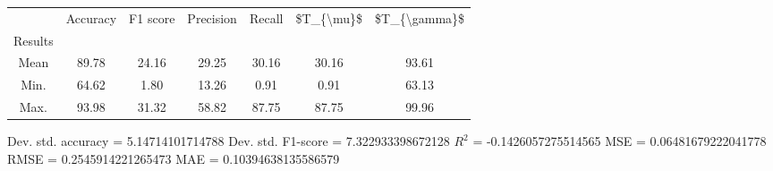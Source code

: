 \begin{tabular}{|c|c|c|c|c|c|c|}
\toprule
{} &  Accuracy &  F1 score &  Precision &  Recall &  \$T\_\{\textbackslash mu\}\$ &  \$T\_\{\textbackslash gamma\}\$ \\
Results &           &           &            &         &            &               \\
\hline
Mean    &     89.78 &     24.16 &      29.25 &   30.16 &      30.16 &         93.61 \\
Min.    &     64.62 &      1.80 &      13.26 &    0.91 &       0.91 &         63.13 \\
Max.    &     93.98 &     31.32 &      58.82 &   87.75 &      87.75 &         99.96 \\
\bottomrule
\end{tabular}

 Dev. std. accuracy = 5.14714101714788
 Dev. std. F1-score = 7.322933398672128
 $R^2$ = -0.1426057275514565
 MSE = 0.06481679222041778
 RMSE = 0.2545914221265473
 MAE = 0.10394638135586579